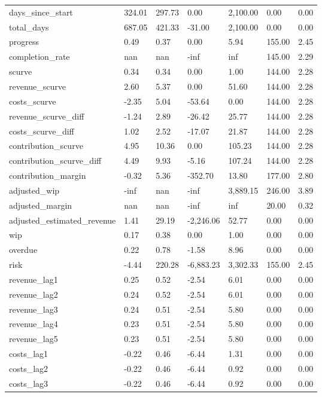 \begin{landscape}
\begin{longtable}[h!]{lllllll}
days_since_start & 324.01 & 297.73 & 0.00 & 2,100.00 & 0.00 & 0.00 \\
total_days & 687.05 & 421.33 & -31.00 & 2,100.00 & 0.00 & 0.00 \\
progress & 0.49 & 0.37 & 0.00 & 5.94 & 155.00 & 2.45 \\
completion_rate & nan & nan & -inf & inf & 145.00 & 2.29 \\
scurve & 0.34 & 0.34 & 0.00 & 1.00 & 144.00 & 2.28 \\
revenue_scurve & 2.60 & 5.37 & 0.00 & 51.60 & 144.00 & 2.28 \\
costs_scurve & -2.35 & 5.04 & -53.64 & 0.00 & 144.00 & 2.28 \\
revenue_scurve_diff & -1.24 & 2.89 & -26.42 & 25.77 & 144.00 & 2.28 \\
costs_scurve_diff & 1.02 & 2.52 & -17.07 & 21.87 & 144.00 & 2.28 \\
contribution_scurve & 4.95 & 10.36 & 0.00 & 105.23 & 144.00 & 2.28 \\
contribution_scurve_diff & 4.49 & 9.93 & -5.16 & 107.24 & 144.00 & 2.28 \\
contribution_margin & -0.32 & 5.36 & -352.70 & 13.80 & 177.00 & 2.80 \\
adjusted_wip & -inf & nan & -inf & 3,889.15 & 246.00 & 3.89 \\
adjusted_margin & nan & nan & -inf & inf & 20.00 & 0.32 \\
adjusted_estimated_revenue & 1.41 & 29.19 & -2,246.06 & 52.77 & 0.00 & 0.00 \\
wip & 0.17 & 0.38 & 0.00 & 1.00 & 0.00 & 0.00 \\
overdue & 0.22 & 0.78 & -1.58 & 8.96 & 0.00 & 0.00 \\
risk & -4.44 & 220.28 & -6,883.23 & 3,302.33 & 155.00 & 2.45 \\
revenue_lag1 & 0.25 & 0.52 & -2.54 & 6.01 & 0.00 & 0.00 \\
revenue_lag2 & 0.24 & 0.52 & -2.54 & 6.01 & 0.00 & 0.00 \\
revenue_lag3 & 0.24 & 0.51 & -2.54 & 5.80 & 0.00 & 0.00 \\
revenue_lag4 & 0.23 & 0.51 & -2.54 & 5.80 & 0.00 & 0.00 \\
revenue_lag5 & 0.23 & 0.51 & -2.54 & 5.80 & 0.00 & 0.00 \\
costs_lag1 & -0.22 & 0.46 & -6.44 & 1.31 & 0.00 & 0.00 \\
costs_lag2 & -0.22 & 0.46 & -6.44 & 0.92 & 0.00 & 0.00 \\
costs_lag3 & -0.22 & 0.46 & -6.44 & 0.92 & 0.00 & 0.00 \\

\end{longtable}
\end{landscape}
